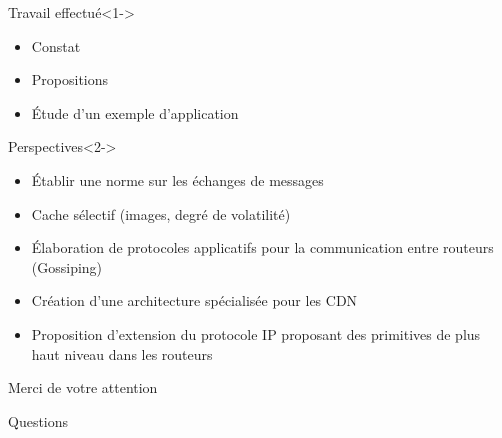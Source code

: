 \documentclass{beamer}
\begin{document}
\begin{frame}

		\begin{block}{Travail effectué}<1->
		\begin{itemize}
			\item Constat%
			\item Propositions
			\item Étude d'un exemple d'application
		\end{itemize}
		\end{block}

		\begin{exampleblock}{Perspectives}<2->
		\begin{itemize}
			\item Établir une norme sur les échanges de messages
			\item Cache s\'electif (images, degr\'e de volatilit\'e)
			\item Élaboration de protocoles applicatifs pour la
				communication entre routeurs (Gossiping)
			\item Création d'une architecture spécialisée pour les CDN
			\item Proposition d'extension du protocole IP proposant
				des primitives de plus haut niveau dans les
				routeurs
		\end{itemize}
		\end{exampleblock}
\end{frame}

\begin{frame}
	\begin{center}	{\huge Merci de votre attention}\end{center}
	\end{frame}
\begin{frame}
	\begin{center}	{\huge Questions}\end{center}
	\end{frame}
\end{document}
